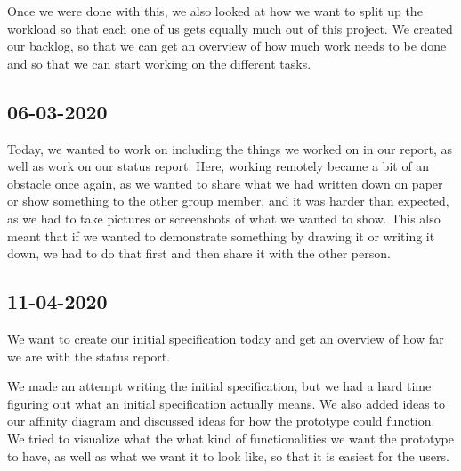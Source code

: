 \documentclass{article}
\begin{document}
Once we were done with this, we also looked at how we want to split up the workload so that each one of us gets equally much out of this project. We created our backlog, so that we can get an overview of how much work needs to be done and so that we can start working on the different tasks.

\subsection*{06-03-2020}
Today, we wanted to work on including the things we worked on in our report, as well as work on our status report. Here, working remotely became a bit of an obstacle once again, as we wanted to share what we had written down on paper or show something to the other group member, and it was harder than expected, as we had to take pictures or screenshots of what we wanted to show. This also meant that if we wanted to demonstrate something by drawing it or writing it down, we had to do that first and then share it with the other person.

\subsection*{11-04-2020}
We want to create our initial specification today and get an overview of how far we are with the status report.

We made an attempt writing the initial specification, but we had a hard time figuring out what an initial specification actually means. We also added ideas to our affinity diagram and discussed ideas for how the prototype could function. We tried to visualize what the what kind of functionalities we want the prototype to have, as well as what we want it to look like, so that it is easiest for the users.
\end{document}
